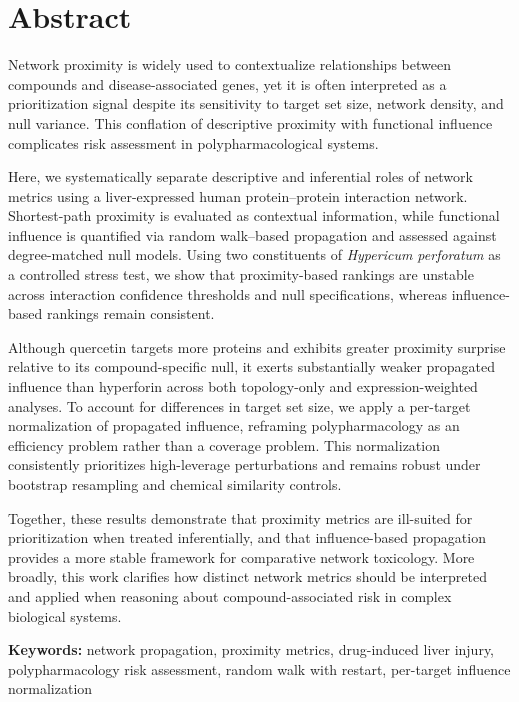 \section*{Abstract}

Network proximity is widely used to contextualize relationships between compounds and disease-associated genes, yet it is often interpreted as a prioritization signal despite its sensitivity to target set size, network density, and null variance.
This conflation of descriptive proximity with functional influence complicates risk assessment in polypharmacological systems.

Here, we systematically separate descriptive and inferential roles of network metrics using a liver-expressed human protein--protein interaction network.
Shortest-path proximity is evaluated as contextual information, while functional influence is quantified via random walk--based propagation and assessed against degree-matched null models.
Using two constituents of \textit{Hypericum perforatum} as a controlled stress test, we show that proximity-based rankings are unstable across interaction confidence thresholds and null specifications, whereas influence-based rankings remain consistent.

Although quercetin targets more proteins and exhibits greater proximity surprise relative to its compound-specific null, it exerts substantially weaker propagated influence than hyperforin across both topology-only and expression-weighted analyses.
To account for differences in target set size, we apply a per-target normalization of propagated influence, reframing polypharmacology as an efficiency problem rather than a coverage problem.
This normalization consistently prioritizes high-leverage perturbations and remains robust under bootstrap resampling and chemical similarity controls.

Together, these results demonstrate that proximity metrics are ill-suited for prioritization when treated inferentially, and that influence-based propagation provides a more stable framework for comparative network toxicology.
More broadly, this work clarifies how distinct network metrics should be interpreted and applied when reasoning about compound-associated risk in complex biological systems.

\vspace{0.5em}
\noindent\textbf{Keywords:} network propagation, proximity metrics, drug-induced liver injury, polypharmacology risk assessment, random walk with restart, per-target influence normalization
